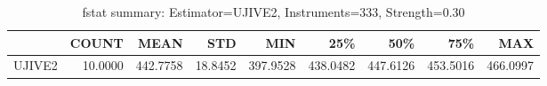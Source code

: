 \begin{table}[ht]
\centering
\caption{fstat summary: Estimator=UJIVE2, Instruments=333, Strength=0.30}
\begin{tabular}{lrrrrrrrr}
\toprule
 & COUNT & MEAN & STD & MIN & 25\% & 50\% & 75\% & MAX \\
\midrule
UJIVE2 & 10.0000 & 442.7758 & 18.8452 & 397.9528 & 438.0482 & 447.6126 & 453.5016 & 466.0997 \\
\bottomrule
\end{tabular}
\end{table}

